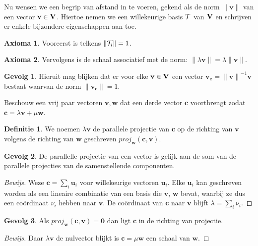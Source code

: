 \documentclass{amsart}
\theoremstyle{definition}
\newtheorem{axm}{Axioma}[section]
\newtheorem{dfn}{Definitie}[section]
\newtheorem{csq}{Gevolg}[section]
\newenvironment{bewijs}{\begin{proof}[Bewijs]}{\end{proof}}
\newcommand{\vecspace}[1][v]{\mathrm{\mathbf{\MakeUppercase#1}}}
\newcommand{\norm}[1]{\lVert{#1}\rVert}
\newcommand{\vvec}[1][v]{\mathbf{#1}}
\newcommand{\uvec}[1][v]{\vvec[#1]_\mathbf{e}}
\newcommand{\vnorm}[1]{\norm{\vvec[#1]}}
\newcommand{\zerovec}{\vvec[0]}
\newcommand{\vecrow}[1][a]{\mathcal{\MakeUppercase{#1}}}
\newcommand{\rvec}[2][i]{{#2}_{#1}}
\newcommand{\rvecr}[2][i]{\rvec[#1]{\vecrow[#2]}}
\begin{document}
Nu wensen we een begrip van afstand in te voeren, gekend als de norm $\vnorm v$ van een vector $\vvec \in \vecspace$.
Hiertoe nemen we een willekeurige basis $\vecrow[t]$ van $\vecspace$ en schrijven er enkele bijzondere eigenschappen aan toe.
\begin{axm}
	Vooreerst is telkens $\norm{\rvecr{t}} = 1$.
\end{axm}

\begin{axm}
	Vervolgens is de schaal associatief met de norm: $\norm{\lambda \vvec} = \lambda\vnorm v$.
\end{axm}

\begin{csq}
	Hieruit mag blijken dat er voor elke $\vvec \in \vecspace$ een vector $\uvec = {\vnorm v}^{-1}\vvec$ bestaat waarvan de norm $\vnorm \uvec = 1$.
\end{csq}

Beschouw een vrij paar vectoren $\vvec, \vvec[w]$ dat een derde vector $\vvec[c]$ voortbrengt zodat $\vvec[c] = \lambda \vvec + \mu \vvec[w]$.

\begin{dfn}
	We noemen $\lambda\vvec$ de parallele projectie van $\vvec[c]$ op de richting van $\vvec$ volgens de richting van $\vvec[w]$ geschreven $proj_{\vvec[w]}(\vvec[c], \vvec)$.
\end{dfn}

\begin{csq}
	De parallelle projectie van een vector is gelijk aan de som van de parallele projecties van de samenstellende componenten.
	\begin{bewijs}
		Weze $\vvec[c] = \sum_{i} {\vvec[u]}_i$ voor willekeurige vectoren $\vvec[u]_i$.
		Elke ${\vvec[u]}_i$ kan geschreven worden als een lineaire combinatie van een basis die $\vvec$, $\vvec[w]$ bevat, waarbij ze dus een coördinaat $\nu_i$ hebben naar $\vvec$.
		De coördinaat van $\vvec[c]$ naar $\vvec$ blijft $\lambda = \sum_i \nu_i$.
	\end{bewijs}
\end{csq}

\begin{csq}
	Als $proj_{\vvec[w]}(\vvec[c], \vvec) = \zerovec$ dan ligt $\vvec[c]$ in de richting van projectie.
	\begin{bewijs}
		Daar $\lambda\vvec$ de nulvector blijkt is $\vvec[c] = \mu\vvec[w]$ een schaal van $\vvec[w]$.
	\end{bewijs}
\end{csq}
\end{document}
